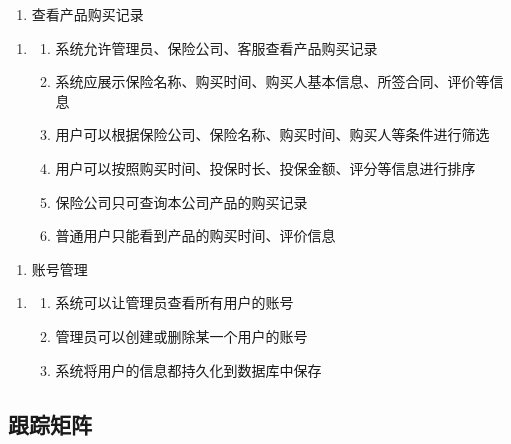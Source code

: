 \documentclass[a4paper]{ctexart}
\begin{document}
\begin{enumerate}[label=UR13.]
  \item 查看产品购买记录
\end{enumerate}
\begin{enumerate}[label=SR18.]
  \item 
  \begin{enumerate}[label=\arabic*).]
    \item 系统允许管理员、保险公司、客服查看产品购买记录
    \item 系统应展示保险名称、购买时间、购买人基本信息、所签合同、评价等信息
    \item 用户可以根据保险公司、保险名称、购买时间、购买人等条件进行筛选
    \item 用户可以按照购买时间、投保时长、投保金额、评分等信息进行排序
    \item 保险公司只可查询本公司产品的购买记录
    \item 普通用户只能看到产品的购买时间、评价信息
  \end{enumerate}
\end{enumerate}

\begin{enumerate}[label=UR14.]
  \item 账号管理
\end{enumerate}
\begin{enumerate}[label=SR19.]
  \item 
  \begin{enumerate}[label=\arabic*).]
    \item 系统可以让管理员查看所有用户的账号
    \item 管理员可以创建或删除某一个用户的账号
    \item 系统将用户的信息都持久化到数据库中保存
  \end{enumerate}
\end{enumerate}

\subsection{跟踪矩阵}
\end{document}
